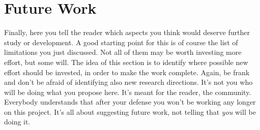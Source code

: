 \section{Future Work}
Finally, here you tell the reader which aspects you think would deserve further study or development. A good starting point for this is of course the list of limitations you just discussed. Not all of them may be worth investing more effort, but some will. The idea of this section is to identify where possible new effort should be invested, in order to make the work complete. Again, be frank and don't be afraid of identifying also new research directions. It's not you who will be doing what you propose here. It's meant for the reader, the community. Everybody understands that after your defense you won't be working any longer on this project. It's all about suggesting future work, not telling that \emph{you} will be doing it. 




